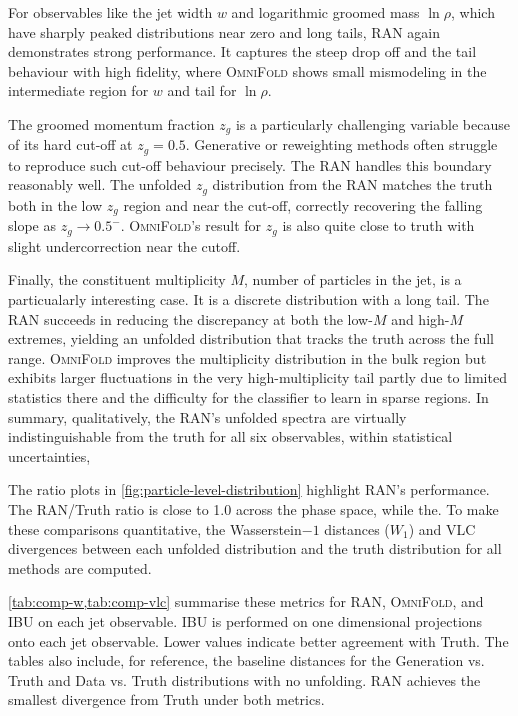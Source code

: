 {{            For observables like the jet width $w$ and logarithmic groomed mass $\ln\rho$, which have sharply peaked distributions near zero and long tails, RAN again demonstrates strong performance.
            It captures the steep drop off and the tail behaviour with high fidelity, where \textsc{OmniFold} shows small mismodeling in the intermediate region for $w$ and tail for $\ln\rho$.
            
            The groomed momentum fraction $z_g$ is a particularly challenging variable because of its hard cut-off at $z_g=0.5$.
            Generative or reweighting methods often struggle to reproduce such cut-off behaviour precisely.
            The RAN handles this boundary reasonably well.
            The unfolded $z_g$ distribution from the RAN matches the truth both in the low $z_g$ region and near the cut-off, correctly recovering the falling slope as $z_g \to 0.5^-$.
            \textsc{OmniFold}’s result for $z_g$ is also quite close to truth with slight undercorrection near the cutoff.
            
            Finally, the constituent multiplicity $M$, number of particles in the jet, is a particualarly interesting case.
            It is a discrete distribution with a long tail.
            The RAN succeeds in reducing the discrepancy at both the low-$M$ and high-$M$ extremes, yielding an unfolded distribution that tracks the truth across the full range.
            \textsc{OmniFold} improves the multiplicity distribution in the bulk region but exhibits larger fluctuations in the very high-multiplicity tail partly due to limited statistics there and the difficulty for the classifier to learn in sparse regions.
            In summary, qualitatively, the RAN’s unfolded spectra are virtually indistinguishable from the truth for all six observables, within statistical uncertainties,
            
            The ratio plots in \cref{fig:particle-level-distribution} highlight RAN’s performance. The RAN/Truth ratio is close to 1.0 across the phase space, while the.
            To make these comparisons quantitative, the Wasserstein\(-1\) distances ($W_1$) and VLC divergences between each unfolded distribution and the truth distribution for all methods are computed.


            \cref{tab:comp-w,tab:comp-vlc} summarise these metrics for RAN, \textsc{OmniFold}, and IBU on each jet observable.
            IBU is performed on one dimensional projections onto each jet observable.
            Lower values indicate better agreement with Truth.
            The tables also include, for reference, the baseline distances for the Generation vs. Truth and Data vs. Truth distributions with no unfolding.
            RAN achieves the smallest divergence from Truth under both metrics.
            
}}
